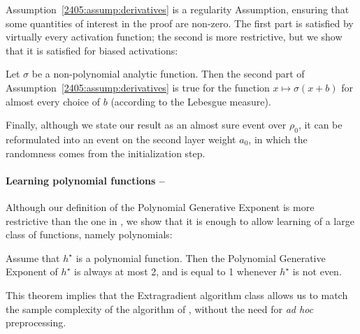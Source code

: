 Assumption~\ref{2405:assump:derivatives} is a regularity Assumption, ensuring that some quantities of interest in the proof are non-zero. The first part is satisfied by virtually every activation function; the second is more restrictive, but we show that it is satisfied for biased activations:
\begin{lemma}\label{2405:lem:bias_activation}
    Let $\sigma$ be a non-polynomial analytic function. Then the second part of Assumption~\ref{2405:assump:derivatives} is true for the function $x \mapsto \sigma(x + b)$ for almost every choice of $b$ (according to the Lebesgue measure).
\end{lemma}

Finally, although we state our result as an almost sure event over $\rho_0$, it can be reformulated into an event on the second layer weight $a_0$, in which the randomness comes from the initialization step.

\paragraph {Learning polynomial functions --} Although our definition of the Polynomial Generative Exponent is more restrictive than the one in \cite{damian2024computational}, we show that it is enough to allow learning of a large class of functions, namely polynomials:
\begin{theorem}\label{2405:thm:poly_pge}
    Assume that $h^\star$ is a polynomial function. Then the Polynomial Generative Exponent of $h^\star$ is always at most 2, and is equal to 1 whenever $h^\star$ is not even.
\end{theorem}
This theorem implies that the Extragradient algorithm class allows us to match the sample complexity of the algorithm of \cite{chen2020learning}, without the need for \emph{ad hoc} preprocessing.


